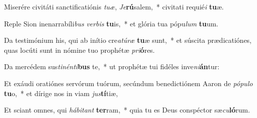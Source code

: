 \item Miserére civitáti sanctificatiónis \textit{tu}\textit{æ}, \textit{Je}\textbf{rú}salem,~* civitati requié\textit{i} \textbf{tu}æ.
\item Reple Sion inenarrabíli\textit{bus} \textit{ver}\textit{bis} \textbf{tu}is,~* et glória tua pópu\textit{lum} \textbf{tu}um.
\item Da testimónium his, qui ab inítio cre\textit{a}\textit{tú}\textit{ræ} \textbf{tu}æ sunt,~* et súscita prædicatiónes, quas locúti sunt in nómine tuo prophétæ \textit{pri}\textbf{ó}res.
\item Da mercédem sus\textit{ti}\textit{nén}\textit{ti}\textbf{bus} te,~* ut prophétæ tui fidéles inve\textit{ni}\textbf{án}tur:
\item Et exáudi oratiónes servórum tuórum, secúndum benedictiónem Aaron de \textit{pó}\textit{pu}\textit{lo} \textbf{tu}o,~* et dírige nos in viam \textit{jus}\textbf{tí}tiæ,
\item Et sciant omnes, qui \textit{há}\textit{bi}\textit{tant} \textbf{ter}ram,~* quia tu es Deus conspéctor sæ\textit{cu}\textbf{ló}rum.
